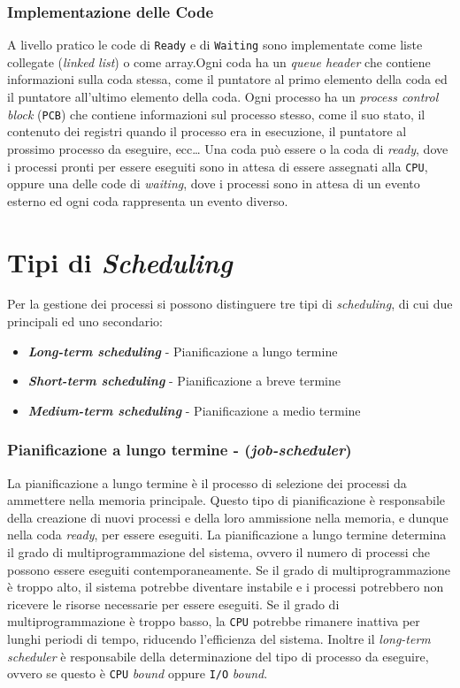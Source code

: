     \subsubsection{Implementazione delle Code}
        A livello pratico le code di \texttt{Ready} e di \texttt{Waiting} sono implementate come liste collegate (\textit{linked list}) o come array.\newline Ogni coda ha un \textit{queue header} che contiene informazioni sulla coda stessa, come il puntatore al primo elemento della coda ed il puntatore all'ultimo elemento della coda. Ogni processo ha un \textit{process control block} (\texttt{PCB}) che contiene informazioni sul processo stesso, come il suo stato, il contenuto dei registri quando il processo era in esecuzione, il puntatore al prossimo processo da eseguire, ecc\dots \newline
        Una coda può essere o la coda di \textit{ready}, dove i processi pronti per essere eseguiti sono in attesa di essere assegnati alla \texttt{CPU}, oppure una delle code di \textit{waiting}, dove i processi sono in attesa di un evento esterno ed ogni coda rappresenta un evento diverso.

\section{Tipi di \textit{Scheduling}}
    Per la gestione dei processi si possono distinguere tre tipi di \textit{scheduling}, di cui due principali ed uno secondario:
    \begin{itemize}
        \item \textit{\textbf{Long-term scheduling}} - Pianificazione a lungo termine
        \item \textit{\textbf{Short-term scheduling}} - Pianificazione a breve termine
        \item \textit{\textbf{Medium-term scheduling}} - Pianificazione a medio termine
    \end{itemize}
    \subsubsection{Pianificazione a lungo termine - (\textit{job-scheduler})}
        La pianificazione a lungo termine è il processo di selezione dei processi da ammettere nella memoria principale. Questo tipo di pianificazione è responsabile della creazione di nuovi processi e della loro ammissione nella memoria, e dunque nella coda \textit{ready}, per essere eseguiti. La pianificazione a lungo termine determina il grado di multiprogrammazione del sistema, ovvero il numero di processi che possono essere eseguiti contemporaneamente. Se il grado di multiprogrammazione è troppo alto, il sistema potrebbe diventare instabile e i processi potrebbero non ricevere le risorse necessarie per essere eseguiti. Se il grado di multiprogrammazione è troppo basso, la \texttt{CPU} potrebbe rimanere inattiva per lunghi periodi di tempo, riducendo l'efficienza del sistema. Inoltre il \textit{long-term scheduler} è responsabile della determinazione del tipo di processo da eseguire, ovvero se questo è \texttt{CPU} \textit{bound} oppure \texttt{I/O} \textit{bound}.
